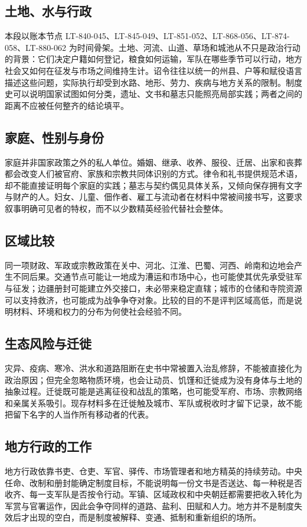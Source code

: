 \subsection{土地、水与行政}
本段以账本节点 LT-840-045、LT-845-049、LT-851-052、LT-868-056、LT-874-058、LT-880-062 为时间骨架。土地、河流、山道、草场和城池从不只是政治行动的背景：它们决定户籍如何登记，粮食如何运输，军队在哪些季节可以行动，地方社会又如何在征发与市场之间维持生计。诏令往往以统一的州县、户等和赋役语言描述这些问题，实际执行却受到水路、地形、劳力、疾病与地方关系的限制。制度史可以说明国家试图如何分类，遗址、文书和墓志只能照亮局部实践；两者之间的距离不应被任何整齐的结论填平。

\subsection{家庭、性别与身份}
家庭并非国家政策之外的私人单位。婚姻、继承、收养、服役、迁居、出家和丧葬都会改变人们被官府、家族和宗教共同体识别的方式。律令和礼书提供规范术语，却不能直接证明每个家庭的实践；墓志与契约偶见具体关系，又倾向保存拥有文字与财产的人。妇女、儿童、佃作者、雇工与流动者在材料中常被间接书写，这要求叙事明确可见者的特权，而不以少数精英经验代替社会整体。

\subsection{区域比较}
同一项财政、军政或宗教政策在关中、河北、江淮、巴蜀、河西、岭南和边地会产生不同后果。交通节点可能让一地成为漕运和市场中心，也可能使其优先承受驻军与征发；边疆册封可能建立外交接口，未必带来稳定直辖；城市的仓储和寺院资源可以支持救济，也可能成为战争争夺对象。比较的目的不是评判区域高低，而是说明材料、环境和权力的分布为何使社会经验不同。

\subsection{生态风险与迁徙}
灾异、疫病、寒冷、洪水和道路阻断在史书中常被置入治乱修辞，不能被直接化为政治原因；但完全忽略物质环境，也会让动员、饥馑和迁徙成为没有身体与土地的抽象过程。迁徙既可能是逃离征役和战乱的策略，也可能受军府、市场、宗教网络和亲属关系吸引。现存材料多在迁徙触及城市、军队或税收时才留下记录，故不能把留下名字的人当作所有移动者的代表。

\subsection{地方行政的工作}
地方行政依靠书吏、仓吏、军官、驿传、市场管理者和地方精英的持续劳动。中央任命、改制和册封能确定制度目标，不能说明每一份文书是否送达、每一种税是否收齐、每一支军队是否按令行动。军镇、区域政权和中央朝廷都需要把收入转化为军赏与官署运作，因此会争夺同样的道路、盐利、田赋和人力。地方并不是制度失效后才出现的空白，而是制度被解释、变通、抵制和重新组织的场所。

